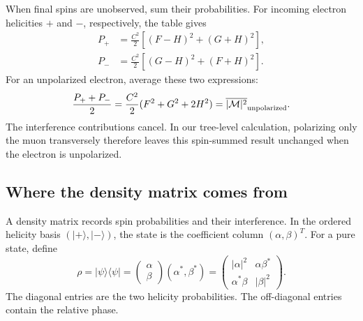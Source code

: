 \documentclass[12pt,a4paper]{article}
\numberwithin{equation}{section}
\newcommand{\M}{\mathcal M}
\begin{document}
When final spins are unobserved, sum their probabilities. For incoming
electron helicities $+$ and $-$, respectively, the table gives
\begin{align}
 P_+&=\frac{C^2}{2}\left[(F-H)^2+(G+H)^2\right],\\
 P_-&=\frac{C^2}{2}\left[(G-H)^2+(F+H)^2\right].
\end{align}
For an unpolarized electron, average these two expressions:
\begin{equation}
 \frac{P_++P_-}{2}
 =\frac{C^2}{2}(F^2+G^2+2H^2)
 =\overline{|\M|^2}_{\rm unpolarized}.
\end{equation}
The interference contributions cancel. In our tree-level calculation,
polarizing only the muon transversely therefore leaves this spin-summed
result unchanged when the electron is unpolarized.

\subsection{Where the density matrix comes from}
A density matrix records spin probabilities and their interference.
In the ordered helicity basis $(|+\rangle,|-\rangle)$, the state is the
coefficient column $(\alpha,\beta)^T$. For a pure state, define
\begin{equation}
 \rho=|\psi\rangle\langle\psi|
 =\begin{pmatrix}\alpha\\\beta\end{pmatrix}(\alpha^*,\beta^*)
 =\begin{pmatrix}
 |\alpha|^2&\alpha\beta^*\\
 \alpha^*\beta&|\beta|^2
 \end{pmatrix}.
 \label{eq:pure-spin-density}
\end{equation}
The diagonal entries are the two helicity probabilities. The off-diagonal
entries contain the relative phase.
\end{document}
